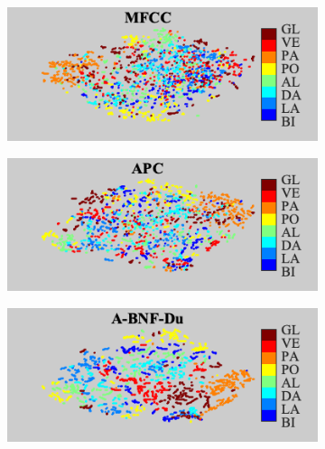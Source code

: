 \documentclass[transmag]{IEEEtran}
\begin{document}
\begin{figure}[!t]
    \begin{subfigure}{0.49\linewidth}
	   \centering
	   \includegraphics[width=1\linewidth]{Rtsne_af_poa_mfcc_disc_bar_adjust_journal.png}
    \end{subfigure}
   \begin{subfigure}{0.49\linewidth}
	   \centering
	   \includegraphics[width=1\linewidth]{Rtsne_af_poa_apc_unlab_600_disc_bar_adjust_journal.png}
    \end{subfigure}
    \newline
   \begin{subfigure}{0.49\linewidth}
	   \centering
	   \includegraphics[width=1\linewidth]{Rtsne_af_poa_bnf_cgn_apc_input_disc_bar_adjust_journal.png}
    \end{subfigure}    \begin{subfigure}{0.49\linewidth}

\end{subfigure}
\end{figure}
\end{document}
